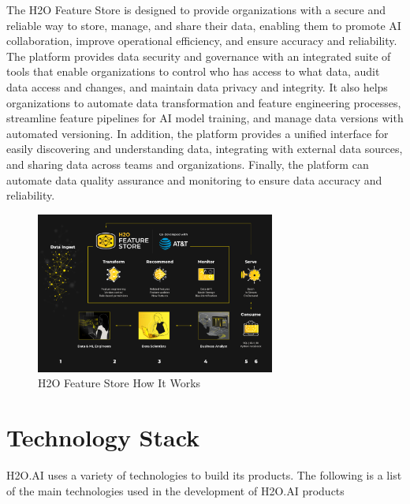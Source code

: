 \documentclass[12pt,a4paper]{report}
\begin{document}
The H2O Feature Store is designed to provide organizations with a secure and reliable 
way to store, manage, and share their data, enabling them to promote AI collaboration, 
improve operational efficiency, and ensure accuracy and reliability. The platform provides 
data security and governance with an integrated suite of tools that enable organizations 
to control who has access to what data, audit data access and changes, and maintain data 
privacy and integrity. It also helps organizations to automate data transformation and 
feature engineering processes, streamline feature pipelines for AI model training, and 
manage data versions with automated versioning. In addition, the platform provides a 
unified interface for easily discovering and understanding data, integrating with 
external data sources, and sharing data across teams and organizations. 
Finally, the platform can automate data quality assurance and monitoring 
to ensure data accuracy and reliability.

\begin{figure}[H]
\centering
\includegraphics[width=0.7\textwidth]{fs.png}
\caption{H2O Feature Store How It Works}
\end{figure}



\section{Technology Stack}

H2O.AI uses a variety of technologies to build its products. The following is a list of the main technologies used in the development of H2O.AI products
\end{document}
